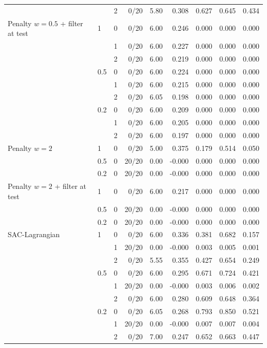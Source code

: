 {\begin{tabular}{llrrrrrrr}
 &  & 2 & 0/20 & 5.80 & 0.308 & 0.627 & 0.645 & 0.434 \\
\addlinespace
Penalty $w{=}0.5$ + filter at test & 1 & 0 & 0/20 & 6.00 & 0.246 & 0.000 & 0.000 & 0.000 \\
 &  & 1 & 0/20 & 6.00 & 0.227 & 0.000 & 0.000 & 0.000 \\
 &  & 2 & 0/20 & 6.00 & 0.219 & 0.000 & 0.000 & 0.000 \\
 & 0.5 & 0 & 0/20 & 6.00 & 0.224 & 0.000 & 0.000 & 0.000 \\
 &  & 1 & 0/20 & 6.00 & 0.215 & 0.000 & 0.000 & 0.000 \\
 &  & 2 & 0/20 & 6.05 & 0.198 & 0.000 & 0.000 & 0.000 \\
 & 0.2 & 0 & 0/20 & 6.00 & 0.209 & 0.000 & 0.000 & 0.000 \\
 &  & 1 & 0/20 & 6.00 & 0.205 & 0.000 & 0.000 & 0.000 \\
 &  & 2 & 0/20 & 6.00 & 0.197 & 0.000 & 0.000 & 0.000 \\
\addlinespace
Penalty $w{=}2$ & 1 & 0 & 0/20 & 5.00 & 0.375 & 0.179 & 0.514 & 0.050 \\
 & 0.5 & 0 & 20/20 & 0.00 & -0.000 & 0.000 & 0.000 & 0.000 \\
 & 0.2 & 0 & 20/20 & 0.00 & -0.000 & 0.000 & 0.000 & 0.000 \\
\addlinespace
Penalty $w{=}2$ + filter at test & 1 & 0 & 0/20 & 6.00 & 0.217 & 0.000 & 0.000 & 0.000 \\
 & 0.5 & 0 & 20/20 & 0.00 & -0.000 & 0.000 & 0.000 & 0.000 \\
 & 0.2 & 0 & 20/20 & 0.00 & -0.000 & 0.000 & 0.000 & 0.000 \\
\addlinespace
SAC-Lagrangian & 1 & 0 & 0/20 & 6.00 & 0.336 & 0.381 & 0.682 & 0.157 \\
 &  & 1 & 20/20 & 0.00 & -0.000 & 0.003 & 0.005 & 0.001 \\
 &  & 2 & 0/20 & 5.55 & 0.355 & 0.427 & 0.654 & 0.249 \\
 & 0.5 & 0 & 0/20 & 6.00 & 0.295 & 0.671 & 0.724 & 0.421 \\
 &  & 1 & 20/20 & 0.00 & -0.000 & 0.003 & 0.006 & 0.002 \\
 &  & 2 & 0/20 & 6.00 & 0.280 & 0.609 & 0.648 & 0.364 \\
 & 0.2 & 0 & 0/20 & 6.05 & 0.268 & 0.793 & 0.850 & 0.521 \\
 &  & 1 & 20/20 & 0.00 & -0.000 & 0.007 & 0.007 & 0.004 \\
 &  & 2 & 0/20 & 7.00 & 0.247 & 0.652 & 0.663 & 0.447 \\

\end{tabular}}
